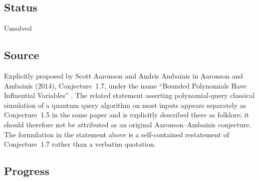 \subsection*{Status}

Unsolved

\subsection*{Source}

Explicitly proposed by Scott Aaronson and Andris Ambainis in Aaronson and
Ambainis (2014), Conjecture~1.7, under the name ``Bounded Polynomials Have
Influential Variables''
.  The related statement asserting
polynomial-query classical simulation of a quantum query algorithm on most
inputs appears separately as Conjecture~1.5 in the same paper and is
explicitly described there as folklore; it should therefore not be
attributed as an original Aaronson--Ambainis conjecture.  The formulation in
the statement above is a self-contained restatement of Conjecture~1.7 rather
than a verbatim quotation.

\subsection*{Progress}

